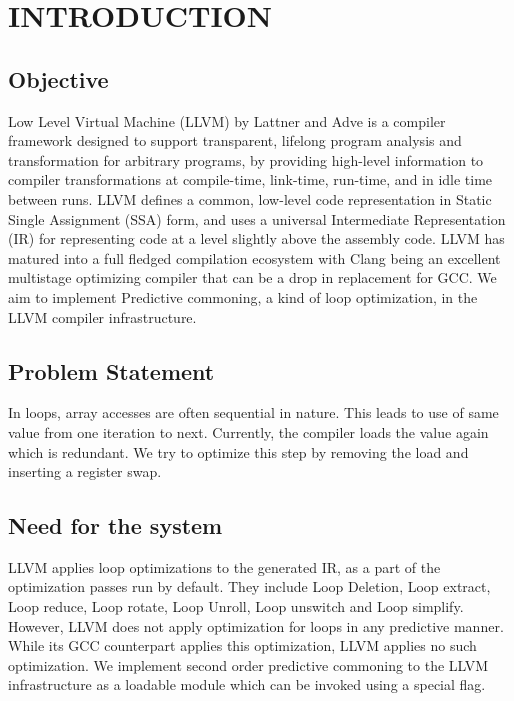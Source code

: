 
\chapter{INTRODUCTION} %
\section{Objective} %
Low Level Virtual Machine (LLVM) by Lattner and Adve \cite{Lattner:2004:LCF:977395.977673} is a compiler framework designed to support transparent, lifelong program analysis and transformation for arbitrary programs, by providing high-level information to compiler transformations at compile-time, link-time, run-time, and in idle time between runs. LLVM defines a common, low-level code representation in Static Single Assignment (SSA) form, and uses a universal Intermediate Representation (IR) for representing code at a level slightly above the assembly code. LLVM has matured into a full fledged compilation ecosystem with Clang being an excellent multistage optimizing compiler that can be a drop in replacement for GCC. We aim to implement Predictive commoning, a kind of loop optimization, in the LLVM compiler infrastructure.

\section{Problem Statement}
In loops, array accesses are often sequential in nature. This leads to use of same value from one iteration to next. Currently, the compiler loads the  value again which is redundant. We try to optimize this step by removing the load and inserting a register swap. 

\section{Need for the system}
LLVM applies loop optimizations to the generated IR, as a part of the optimization passes run by default. They include Loop Deletion, Loop extract, Loop reduce, Loop rotate, Loop Unroll, Loop unswitch and Loop simplify. However, LLVM does not apply optimization for loops in any predictive manner. While its GCC counterpart applies this optimization, LLVM applies no such optimization. We implement second order predictive commoning to the LLVM infrastructure as a loadable module which can be invoked using a special flag.

